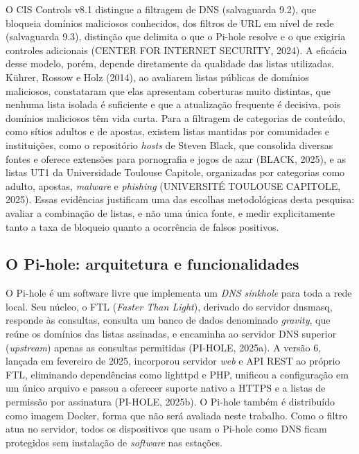 \documentclass[12pt,a4paper]{article}
\begin{document}
O CIS Controls v8.1 distingue a filtragem de DNS (salvaguarda 9.2), que bloqueia domínios maliciosos conhecidos, dos filtros de URL em nível de rede (salvaguarda 9.3), distinção que delimita o que o Pi-hole resolve e o que exigiria controles adicionais (CENTER FOR INTERNET SECURITY, 2024). A eficácia desse modelo, porém, depende diretamente da qualidade das listas utilizadas. Kührer, Rossow e Holz (2014), ao avaliarem listas públicas de domínios maliciosos, constataram que elas apresentam coberturas muito distintas, que nenhuma lista isolada é suficiente e que a atualização frequente é decisiva, pois domínios maliciosos têm vida curta. Para a filtragem de categorias de conteúdo, como sítios adultos e de apostas, existem listas mantidas por comunidades e instituições, como o repositório \textit{hosts} de Steven Black, que consolida diversas fontes e oferece extensões para pornografia e jogos de azar (BLACK, 2025), e as listas UT1 da Universidade Toulouse Capitole, organizadas por categorias como adulto, apostas, \textit{malware} e \textit{phishing} (UNIVERSITÉ TOULOUSE CAPITOLE, 2025). Essas evidências justificam uma das escolhas metodológicas desta pesquisa: avaliar a combinação de listas, e não uma única fonte, e medir explicitamente tanto a taxa de bloqueio quanto a ocorrência de falsos positivos.

\subsection{O Pi-hole: arquitetura e funcionalidades}
O Pi-hole é um software livre que implementa um \textit{DNS sinkhole} para toda a rede local. Seu núcleo, o FTL (\textit{Faster Than Light}), derivado do servidor dnsmasq, responde às consultas, consulta um banco de dados denominado \textit{gravity}, que reúne os domínios das listas assinadas, e encaminha ao servidor DNS superior (\textit{upstream}) apenas as consultas permitidas (PI-HOLE, 2025a). A versão 6, lançada em fevereiro de 2025, incorporou servidor \textit{web} e API REST ao próprio FTL, eliminando dependências como lighttpd e PHP, unificou a configuração em um único arquivo e passou a oferecer suporte nativo a HTTPS e a listas de permissão por assinatura (PI-HOLE, 2025b). O Pi-hole também é distribuído como imagem Docker, forma que não será avaliada neste trabalho. Como o filtro atua no servidor, todos os dispositivos que usam o Pi-hole como DNS ficam protegidos sem instalação de \textit{software} nas estações.
\end{document}
